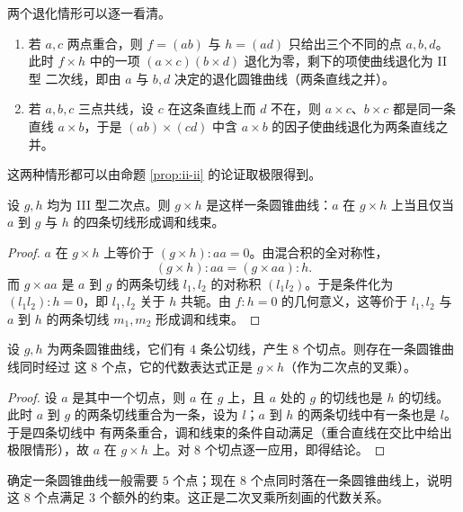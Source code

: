 \begin{remark}
两个退化情形可以逐一看清。
\begin{enumerate}[label=(\arabic*),itemsep=2pt]
  \item 若 $a,c$ 两点重合，则 $f=(ab)$ 与 $h=(ad)$ 只给出三个不同的点 $a,b,d$。此时
        $f\times h$ 中的一项 $(a\times c)(b\times d)$ 退化为零，剩下的项使曲线退化为 II 型
        二次线，即由 $a$ 与 $b,d$ 决定的退化圆锥曲线（两条直线之并）。
  \item 若 $a,b,c$ 三点共线，设 $c$ 在这条直线上而 $d$ 不在，则
        $a\times c$、$b\times c$ 都是同一条直线 $a\times b$，于是 $(ab)\times(cd)$ 中含
        $a\times b$ 的因子使曲线退化为两条直线之并。
\end{enumerate}
这两种情形都可以由命题 \ref{prop:ii-ii} 的论证取极限得到。
\end{remark}

\begin{proposition}
\label{prop:iii-iii-cross}
设 $g,h$ 均为 III 型二次点。则 $g\times h$ 是这样一条圆锥曲线：$a$ 在 $g\times h$ 上当且仅当
$a$ 到 $g$ 与 $h$ 的四条切线形成调和线束。
\end{proposition}

\begin{proof}
$a$ 在 $g\times h$ 上等价于 $(g\times h):aa=0$。由混合积的全对称性，
\[
(g\times h):aa=(g\times aa):h .
\]
而 $g\times aa$ 是 $a$ 到 $g$ 的两条切线 $l_1,l_2$ 的对称积 $(l_1l_2)$。于是条件化为
$(l_1l_2):h=0$，即 $l_1,l_2$ 关于 $h$ 共轭。由 $f:h=0$ 的几何意义，这等价于 $l_1,l_2$ 与
$a$ 到 $h$ 的两条切线 $m_1,m_2$ 形成调和线束。
\end{proof}

\begin{corollary}[8 个切点共圆锥曲线]
设 $g,h$ 为两条圆锥曲线，它们有 $4$ 条公切线，产生 $8$ 个切点。则存在一条圆锥曲线同时经过
这 $8$ 个点，它的代数表达式正是 $g\times h$（作为二次点的叉乘）。
\end{corollary}

\begin{proof}
设 $a$ 是其中一个切点，则 $a$ 在 $g$ 上，且 $a$ 处的 $g$ 的切线也是 $h$ 的切线。此时 $a$ 到
$g$ 的两条切线重合为一条，设为 $l$；$a$ 到 $h$ 的两条切线中有一条也是 $l$。于是四条切线中
有两条重合，调和线束的条件自动满足（重合直线在交比中给出极限情形），故 $a$ 在 $g\times h$
上。对 $8$ 个切点逐一应用，即得结论。
\end{proof}

\begin{remark}
确定一条圆锥曲线一般需要 $5$ 个点；现在 $8$ 个点同时落在一条圆锥曲线上，说明这 $8$ 个点满足
$3$ 个额外的约束。这正是二次叉乘所刻画的代数关系。
\end{remark}

